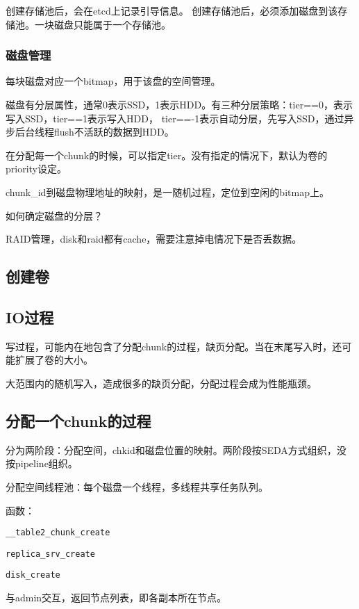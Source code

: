 创建存储池后，会在etcd上记录引导信息。
创建存储池后，必须添加磁盘到该存储池。一块磁盘只能属于一个存储池。

\subsubsection{磁盘管理}

每块磁盘对应一个bitmap，用于该盘的空间管理。

磁盘有分层属性，通常0表示SSD，1表示HDD。有三种分层策略：tier==0，表示写入SSD，tier==1表示写入HDD，
tier==-1表示自动分层，先写入SSD，通过异步后台线程flush不活跃的数据到HDD。

在分配每一个chunk的时候，可以指定tier。没有指定的情况下，默认为卷的priority设定。

chunk\_id到磁盘物理地址的映射，是一随机过程，定位到空闲的bitmap上。

如何确定磁盘的分层？

RAID管理，disk和raid都有cache，需要注意掉电情况下是否丢数据。

\subsection{创建卷}

\subsection{IO过程}

写过程，可能内在地包含了分配chunk的过程，缺页分配。当在末尾写入时，还可能扩展了卷的大小。

大范围内的随机写入，造成很多的缺页分配，分配过程会成为性能瓶颈。

\subsection{分配一个chunk的过程}

分为两阶段：分配空间，chkid和磁盘位置的映射。两阶段按SEDA方式组织，没按pipeline组织。

分配空间线程池：每个磁盘一个线程，多线程共享任务队列。


函数：
\begin{compactitem}
\item \verb|__table2_chunk_create|
\item \verb|replica_srv_create|
\item \verb|disk_create|
\end{compactitem}

与admin交互，返回节点列表，即各副本所在节点。

